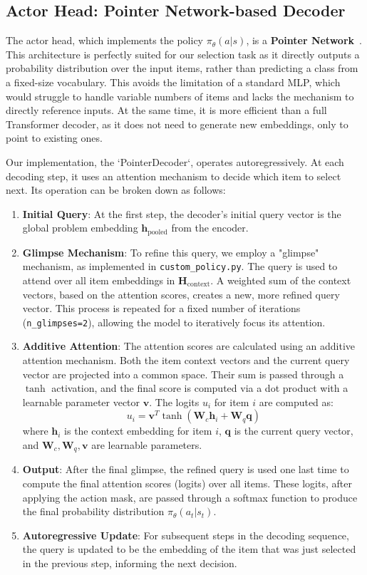 \subsection{Actor Head: Pointer Network-based Decoder}
The actor head, which implements the policy \(\pi_\theta(a|s)\), is a \textbf{Pointer Network}~\cite{vinyalsPointerNetworks2017}. This architecture is perfectly suited for our selection task as it directly outputs a probability distribution over the input items, rather than predicting a class from a fixed-size vocabulary. This avoids the limitation of a standard MLP, which would struggle to handle variable numbers of items and lacks the mechanism to directly reference inputs. At the same time, it is more efficient than a full Transformer decoder, as it does not need to generate new embeddings, only to point to existing ones.

Our implementation, the `PointerDecoder`, operates autoregressively. At each decoding step, it uses an attention mechanism to decide which item to select next. Its operation can be broken down as follows:
\begin{enumerate}
    \item \textbf{Initial Query}: At the first step, the decoder's initial query vector is the global problem embedding \(\mathbf{h}_{\text{pooled}}\) from the encoder.
    \item \textbf{Glimpse Mechanism}: To refine this query, we employ a "glimpse" mechanism, as implemented in \texttt{custom\_policy.py}. The query is used to attend over all item embeddings in \(\mathbf{H}_{\text{context}}\). A weighted sum of the context vectors, based on the attention scores, creates a new, more refined query vector. This process is repeated for a fixed number of iterations (\texttt{n\_glimpses=2}), allowing the model to iteratively focus its attention.
    \item \textbf{Additive Attention}: The attention scores are calculated using an additive attention mechanism. Both the item context vectors and the current query vector are projected into a common space. Their sum is passed through a \(\tanh\) activation, and the final score is computed via a dot product with a learnable parameter vector \(\mathbf{v}\). The logits \(u_i\) for item \(i\) are computed as:
    \[ u_i = \mathbf{v}^T \tanh(\mathbf{W}_c \mathbf{h}_i + \mathbf{W}_q \mathbf{q}) \]
    where \(\mathbf{h}_i\) is the context embedding for item \(i\), \(\mathbf{q}\) is the current query vector, and \(\mathbf{W}_c, \mathbf{W}_q, \mathbf{v}\) are learnable parameters.
    \item \textbf{Output}: After the final glimpse, the refined query is used one last time to compute the final attention scores (logits) over all items. These logits, after applying the action mask, are passed through a softmax function to produce the final probability distribution \(\pi_\theta(a_t|s_t)\).
    \item \textbf{Autoregressive Update}: For subsequent steps in the decoding sequence, the query is updated to be the embedding of the item that was just selected in the previous step, informing the next decision.
\end{enumerate}

